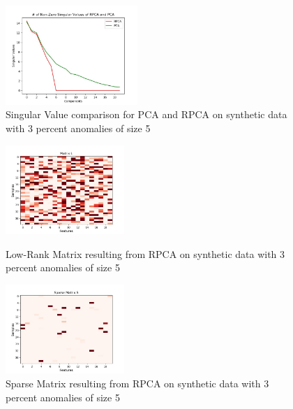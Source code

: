\documentclass[conference]{IEEEtran}
\begin{document}
\begin{figure}[H]
    \centering
    \includegraphics[width=50mm, scale=0.5]{Singular_Value_Plot_Test_120AnomSize5.jpg}
    \caption{Singular Value comparison for PCA and RPCA on synthetic data with 3 percent anomalies of size 5}
    \label{fig:singvaltrain1205}
\end{figure}

\begin{figure}[H]
\begin{minipage}[b]{0.45\linewidth}
    \centering
    \includegraphics[width=45mm, scale=0.5]{L_120AnomSize5.jpg}
    \caption{Low-Rank Matrix resulting from RPCA on synthetic data with 3 percent anomalies of size 5}
    \label{fig:Ltrain1205}
\end{minipage}
\quad
\begin{minipage}[b]{0.45\linewidth}
    \includegraphics[width=45mm, scale=0.5]{S_120AnomSize5.jpg}
    \caption{Sparse Matrix resulting from RPCA on synthetic data with 3 percent anomalies of size 5}
    \label{fig:Strain1205}
\end{minipage}
\end{figure}
\end{document}
